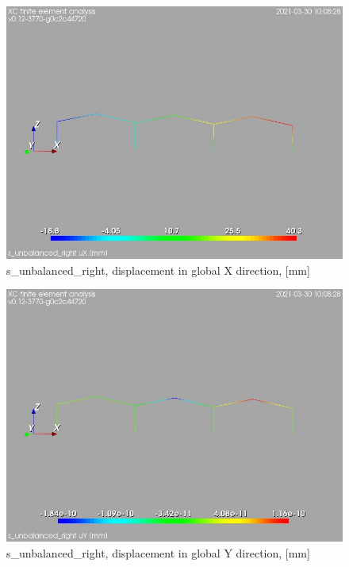 \cleardoublepage
\begin{figure}
\begin{center}
\includegraphics[width=\linewidth]{calc_results/sole_zeinali/text/graphics/resSimplLC/s_unbalanced_righttotaluX}
\caption{s_unbalanced_right, displacement in global X direction, [mm]}
\end{center}
\end{figure}
\begin{figure}
\begin{center}
\includegraphics[width=\linewidth]{calc_results/sole_zeinali/text/graphics/resSimplLC/s_unbalanced_righttotaluY}
\caption{s_unbalanced_right, displacement in global Y direction, [mm]}
\end{center}
\end{figure}
